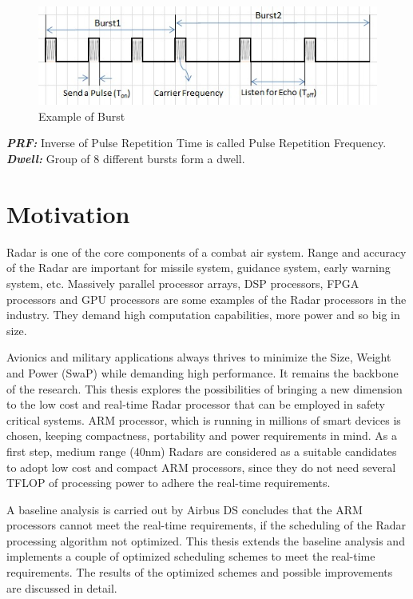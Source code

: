 \begin{figure}[h!]
	\centering
	\includegraphics[]{figures/prf}
	\caption{Example of Burst}
	\label{fig:intro:radar:prf}
\end{figure}
\vspace*{0.2cm}
\noindent
\textsl{\textbf{PRF:}} Inverse of Pulse Repetition Time is called Pulse Repetition Frequency. \\
\noindent
\textsl{\textbf{Dwell:}} Group of 8 different bursts form a dwell.
\FloatBarrier

\section{Motivation}
\label{sec:intro:motivation}
Radar is one of the core components of a combat air system. Range and accuracy of the Radar are important for missile system, guidance system, early warning system, etc. Massively parallel processor arrays, DSP processors, FPGA processors and GPU processors\cite{HalmSwe} are some examples of the Radar processors in the industry.  They demand high computation capabilities, more power and so big in size.

Avionics and military applications always thrives to minimize the Size, Weight and Power (SwaP) while demanding high performance. It remains the backbone of the research. This thesis explores the possibilities of bringing a new dimension to the low cost and real-time Radar processor that can be employed in safety critical systems. ARM processor, which is running in millions of smart devices\cite{armWeb} is chosen, keeping compactness, portability and power requirements in mind. As a first step, medium range (40nm) Radars are considered as a suitable candidates to adopt low cost and compact ARM processors, since they do not need several TFLOP of processing power to adhere the real-time requirements.

A baseline analysis is carried out by Airbus DS concludes that the ARM processors cannot meet the real-time requirements, if the scheduling of the Radar processing algorithm not optimized. This thesis extends the baseline analysis and implements a couple of optimized scheduling schemes to meet the real-time requirements. The results of the optimized schemes and possible improvements are discussed in detail.

